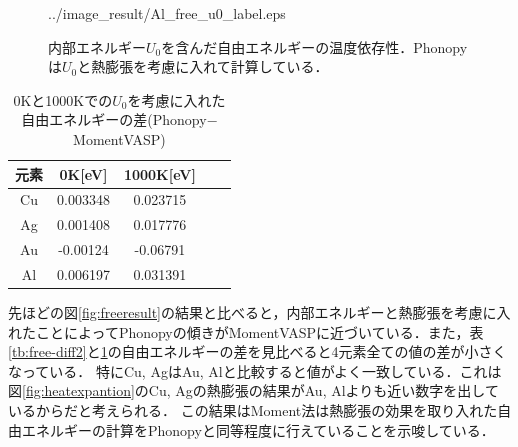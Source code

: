 \begin{figure}[htbp]
\begin{minipage}[b]{0.5\linewidth}
  {../image_result/Al_free_u0_label.eps}
  \label{free8}
 \end{minipage}
 \caption{内部エネルギー$U_0$を含んだ自由エネルギーの温度依存性．Phonopyは$U_0$と熱膨張を考慮に入れて計算している．}\label{fig:freeresult2}
\end{figure}

\begin{table}[htbp]
\caption{0Kと1000Kでの$U_0$を考慮に入れた自由エネルギーの差(Phonopy$-$MomentVASP)}
  \label{tb:free-diff3}
  \centering
  \begin{tabular}{ccccc}\hline
    元素 & 0K[eV] & 1000K[eV] \\ \hline \hline
    Cu & 0.003348 & 0.023715 \\
    Ag & 0.001408 & 0.017776 \\
    Au & -0.00124 & -0.06791 \\
    Al & 0.006197 & 0.031391 \\ \hline
  \end{tabular}
\end{table}

先ほどの図\ref{fig:freeresult}の結果と比べると，内部エネルギーと熱膨張を考慮に入れたことによってPhonopyの傾きがMomentVASPに近づいている．また，表\ref{tb:free-diff2}と\ref{tb:free-diff3}の自由エネルギーの差を見比べると4元素全ての値の差が小さくなっている．
特にCu, AgはAu, Alと比較すると値がよく一致している．これは図\ref{fig:heatexpantion}のCu, Agの熱膨張の結果がAu, Alよりも近い数字を出しているからだと考えられる．
この結果はMoment法は熱膨張の効果を取り入れた自由エネルギーの計算をPhonopyと同等程度に行えていることを示唆している．

